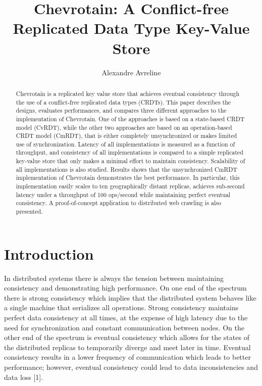 \documentclass[sigconf,nonacm,10pt]{acmart}
\begin{document}
\title{Chevrotain: A Conflict-free Replicated Data Type Key-Value Store}

\author{Alexandre Avreline}

\begin{abstract}
Chevrotain is a replicated key value store that achieves eventual consistency through the use of a conflict-free replicated data types (CRDTs). This paper describes the designs, evaluates performances, and compares three different approaches to the implementation of Chevrotain. One of the approaches is based on a state-based CRDT model (CvRDT), while the other two approaches are based on an operation-based CRDT model (CmRDT), that is either completely unsynchronized or makes limited use of synchronization. Latency of all implementations is measured as a function of throughput, and consistency of all implementations is compared to a simple replicated key-value store that only makes a minimal effort to maintain consistency. Scalability of all implementations is also studied. Results shows that the unsynchronized CmRDT implementation of Chevrotain demonstrates the best performance. In particular, this implementation easily scales to ten geographically distant replicas, achieves sub-second latency under a throughput of 100 ops/second while maintaining perfect eventual consistency. A proof-of-concept application to distributed web crawling is also presented.\end{abstract}


\maketitle

\section{Introduction}

In distributed systems there is always the tension between maintaining consistency and demonstrating high performance. On one end of the spectrum there is strong consistency which implies that the distributed system behaves like a single machine that serializes all operations. Strong consistency maintains perfect data consistency at all times, at the expense of high latency due to the need for synchronization and constant communication between nodes. On the other end of the spectrum is eventual consistency which allows for the states of the distributed replicas to temporarily diverge and meet later in time. Eventual consistency results in a lower frequency of communication which leads to better performance; however, eventual consistency could lead to data inconsistencies and data loss [1].
\end{document}

